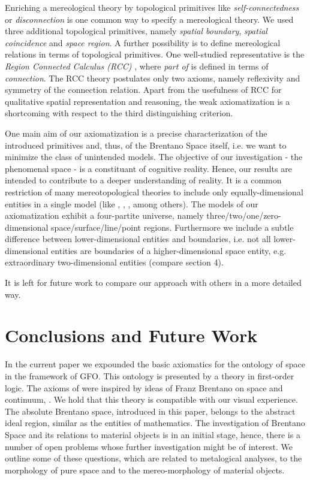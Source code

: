 \documentclass{ao2e}
\begin{document}
{Enriching a mereological theory by topological primitives like \textit{self-connectedness} \cite{Borgo96apointless} or \textit{disconnection} \cite{eschenbach}
is one common way to specify a mereological theory. We used three additional topological primitives, namely \textit{spatial boundary}, \textit{spatial coincidence} and \textit{space region}. 
A further possibility is to define mereological relations in terms of topological primitives. One well-studied representative is the 
\textit{Region Connected Calculus (RCC)} \cite{Randell92aspatial}, where \textit{part of} is defined in terms of \textit{connection}. The RCC theory postulates only two axioms, namely reflexivity and symmetry 
of the connection relation. Apart from the usefulness of RCC for qualitative spatial representation and reasoning, the weak axiomatization is a shortcoming 
with respect to the third distinguishing criterion.

One main aim of our axiomatization is a precise characterization of the introduced primitives and, thus, of the 
Brentano Space itself, i.e. we want to minimize the class of unintended models. The objective of our investigation - the phenomenal space - is a constituant of cognitive reality. Hence, our results are intended to contribute to a deeper understanding of reality. 
It is a common restriction of many mereotopological theories to include only equally-dimensional entities in a single model (like \cite{Borgo96apointless,Randell92aspatial}, \cite{gotts-n-1996-a}, \cite{galton-a-1996-a}, among others). The models of 
our axiomatization exhibit a four-partite universe, namely three/two/one/zero-dimensional space/surface/line/point regions. Furthermore we include a subtle difference between 
lower-dimensional entities and boundaries, i.e. not all lower-dimensional entities are boundaries of a higher-dimensional space entity, e.g. extraordinary two-dimensional entities (compare section 4).

It is left for future work to compare our approach with others in a more detailed way.
    

\section{Conclusions and Future Work}

In the current paper we expounded the basic axiomatics for the ontology of space in the framework of GFO.
This ontology is presented by a theory  in first-order logic. The axioms of  were inspired by ideas of Franz Brentano on space and continuum, \cite{brentano-f-1976-a}. We hold that this theory is compatible with our visual experience. The absolute Brentano space,
introduced in this paper, belongs to the abstract ideal region, similar as the entities of mathematics.
The investigation of Brentano Space and its relations to material objects is in an initial stage, hence, there is a number of open problems whose further investigation might be of interest. We outline some of these questions, which are related to metalogical analyses, to the morphology of pure space and to the mereo-morphology of material objects. \\

}
\end{document}
